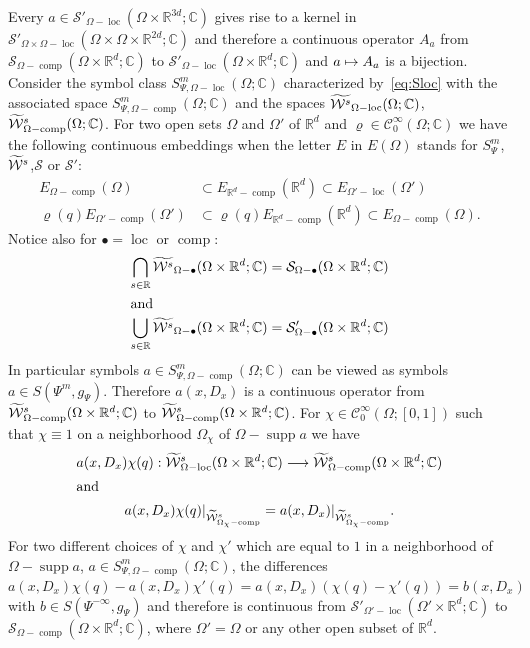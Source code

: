 \documentclass[AHL,Unicode,longabstracts]{cedram}
\newcommand{\C}{\mathbb{C}}
\newcommand{\R}{\mathbb{R}}
\newcommand{\clW}{\mathcal{W}}
\newcommand{\clC}{\mathcal{C}}
\newcommand{\clS}{\mathcal{S}}
\DeclareMathOperator{\ccomp}{comp}
\DeclareMathOperator{\suppp}{supp}
\DeclareMathOperator{\locc}{loc}
\let\oldtilde\tilde
\renewcommand*{\tilde}[1]{\mathchoice{\widetilde{#1}}{\widetilde{#1}}{\oldtilde{#1}}{\oldtilde{#1}}}
\renewcommand*{\to}{\mathchoice{\longrightarrow}{\rightarrow}{\rightarrow}{\rightarrow}}
\let\oldmapsto\mapsto
\renewcommand*{\mapsto}{\mathchoice{\longmapsto}{\oldmapsto}{\oldmapsto}{\oldmapsto}}
\begin{document}
Every $a\in \clS'_{\Omega-\locc}(\Omega\times\R^{3d};\C)$ gives rise to a kernel in $\clS'_{\Omega\times \Omega-\locc}(\Omega\times \Omega\times\R^{2d};\C)$ and therefore a continuous operator $A_{a}$ from $\clS_{\Omega-\ccomp}(\Omega\times \R^{d};\C)$ to $\clS'_{\Omega-\locc}(\Omega\times\R^{d};\C)$ and $a\mapsto A_{a}$ is a bijection. Consider the symbol class $S^{m}_{\Psi,\Omega-\locc}(\Omega;\C)$ characterized by~\eqref{eq:Sloc} with the associated space $S^{m}_{\Psi,\Omega-\ccomp}(\Omega;\C)$ and the spaces $\tilde{\clW^{s}}_{\Omega-{\locc}}(\Omega;\C)$, $\tilde{\clW}^{s}_{\Omega-\ccomp}(\Omega;\C)$. For two open sets $\Omega$ and $\Omega'$ of $\R^{d}$ and $\varrho\in \clC^{\infty}_{0}(\Omega;\C)$ we have the following continuous embeddings when the letter $E$ in $E(\Omega)$ stands for $S^{m}_{\Psi}$, $\tilde{\clW}^{s}$,\linebreak $\clS$ or $\clS'$:
\begin{align*}
E_{\Omega-\ccomp}(\Omega)&\subset E_{\R^{d}-\ccomp}(\R^{d})\subset E_{\Omega'-\locc}(\Omega')\\
\varrho(q)E_{\Omega'-\ccomp}(\Omega')&\subset \varrho(q)E_{\R^{d}-\ccomp}(\R^{d})\subset E_{\Omega-\ccomp}(\Omega).
\end{align*}
Notice also for $\bullet=\locc$ or $\ccomp$:
\begin{align*}
\bigcap_{s\in \R}\tilde{\clW^{s}}_{\Omega-\bullet}(\Omega\times\R^{d};\C)&=\clS_{\Omega-\bullet}(\Omega\times\R^{d};\C)\\
\intertext{and}
\bigcup_{s\in \R}\tilde{\clW^{s}}_{\Omega-\bullet}(\Omega\times\R^{d};\C)&=\clS_{\Omega-\bullet}'(\Omega\times\R^{d};\C)
\end{align*}
\pagebreak{}
\noindent
In particular symbols $a\in S^{m}_{\Psi,\Omega-\ccomp}(\Omega;\C)$ can be viewed as symbols $a\in S(\Psi^{m},g_{\Psi})$. Therefore $a(x,D_{x})$ is a continuous operator from $\tilde{\clW}^{s}_{\Omega-\ccomp}(\Omega\times\R^{d};\C)$ to $\tilde{\clW}^{s}_{\Omega-\ccomp}(\Omega\times\R^{d};\C)$. For $\chi\in \clC^{\infty}_{0}(\Omega;[0,1])$ such that $\chi\equiv 1$ on a neighborhood $\Omega_{\chi}$ of $\Omega-\suppp a$ we have
\begin{gather*}
a(x,D_{x})\chi(q):\tilde{\clW}^{s}_{\Omega-\locc}(\Omega\times\R^{d};\C)\to
\tilde{\clW}^{s}_{\Omega-\ccomp}(\Omega\times\R^{d};\C)\\
\intertext{and} a(x,D_{x})\chi(q)|_{\widetilde{\clW}^{s}_{\Omega_{\chi}-\ccomp}}=a(x,D_{x})|_{\widetilde{\clW}^{s}_{\Omega_{\chi}-\ccomp}}.
\end{gather*}
For two different choices of $\chi$ and $\chi'$ which are equal to $1$ in a neighborhood of $\Omega-\suppp a$, $a\in S^{m}_{\Psi,\Omega-\ccomp}(\Omega;\C)$, the differences $a(x,D_{x})\chi(q)-a(x,D_{x})\chi'(q)=a(x,D_{x})(\chi(q)-\chi'(q))=b(x,D_{x})$ with $b\in S(\Psi^{-\infty},g_{\Psi})$ and therefore is continuous from $\clS'_{\Omega'-\locc}(\Omega'\times\R^{d};\C)$ to $\clS_{\Omega-\ccomp}(\Omega\times\R^{d};\C)$, where $\Omega'=\Omega$ or any other open subset of $\R^{d}$.
\end{document}
